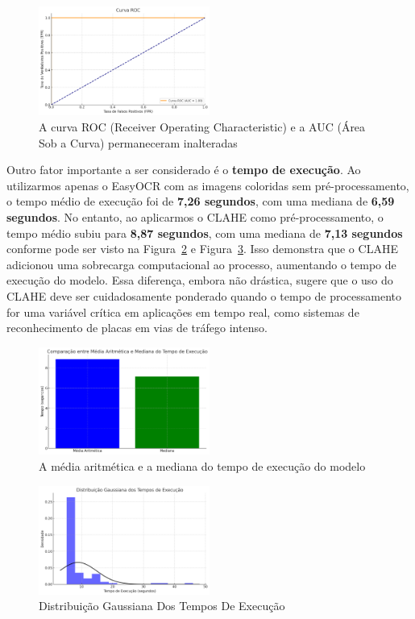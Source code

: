 \documentclass[conference]{IEEEtran}
\begin{document}
\begin{figure}[htbp]
	\centerline{\includegraphics[width=0.5\textwidth]{img10.png}}
	\caption{A curva ROC (Receiver Operating Characteristic) e a AUC (Área Sob a Curva) permaneceram inalteradas }
	\label{img10}
\end{figure}

Outro fator importante a ser considerado é o \textbf{tempo de execução}. Ao utilizarmos apenas o EasyOCR com as imagens coloridas sem pré-processamento, o tempo médio de execução foi de \textbf{7,26 segundos}, com uma mediana de \textbf{6,59 segundos}. No entanto, ao aplicarmos o CLAHE como pré-processamento, o tempo médio subiu para \textbf{8,87 segundos}, com uma mediana de \textbf{7,13 segundos} conforme pode ser visto na Figura~\ref{img11} e Figura~\ref{img12}. Isso demonstra que o CLAHE adicionou uma sobrecarga computacional ao processo, aumentando o tempo de execução do modelo. Essa diferença, embora não drástica, sugere que o uso do CLAHE deve ser cuidadosamente ponderado quando o tempo de processamento for uma variável crítica em aplicações em tempo real, como sistemas de reconhecimento de placas em vias de tráfego intenso.

\begin{figure}[htbp]
	\centerline{\includegraphics[width=0.5\textwidth]{img11.png}}
	\caption{A média aritmética e a mediana do tempo de execução do modelo}
	\label{img11}
\end{figure}

\begin{figure}[htbp]
	\centerline{\includegraphics[width=0.5\textwidth]{img12.png}}
	\caption{Distribuição Gaussiana Dos Tempos De Execução}
	\label{img12}
\end{figure}
\end{document}
